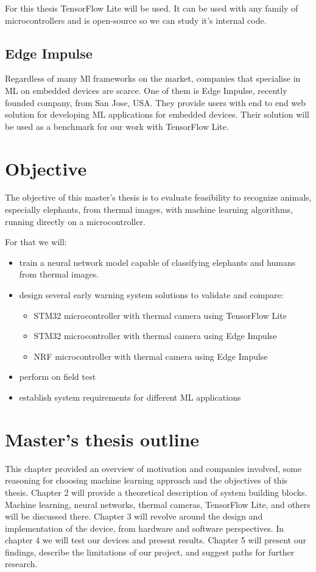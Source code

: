 For this thesis TensorFlow Lite will be used. It can be used with any family of microcontrollers and is open-source so we can study it's internal code.


\subsection{ Edge Impulse}

Regardless of many Ml frameworks on the market, companies that specialise in ML on embedded devices are scarce.
One of them is Edge Impulse, recently founded company, from San Jose, USA.
They provide users with end to end web solution for developing ML applications for embedded devices.
Their solution will be used as a benchmark for our work with TensorFlow Lite.


\section{ Objective}

The objective of this master's thesis is to evaluate feasibility to recognize animals, especially elephants, from thermal images, with machine learning algorithms, running directly on a microcontroller.

For that we will:

\begin{itemize}
    \item train a neural network model capable of classifying elephants and humans from thermal images.
    \item design several early warning system solutions to validate and compare:
    \begin{itemize}
        \item STM32 microcontroller with thermal camera using TensorFlow Lite
        \item STM32 microcontroller with thermal camera using Edge Impulse
        \item NRF microcontroller with thermal camera using Edge Impulse
    \end{itemize}
    \item perform on field test
    \item establish system requirements for different ML applications
\end{itemize}


\section{ Master's thesis outline}

This chapter provided an overview of motivation and companies involved, some reasoning for choosing machine learning approach and the objectives of this thesis.
Chapter 2 will provide a theoretical description of system building blocks. Machine learning, neural networks, thermal cameras, TensorFlow Lite, and others will be discussed there.
Chapter 3 will revolve around the design and implementation of the device, from hardware and software perspectives.
In chapter 4 we will test our devices and present results.
Chapter 5 will present our findings, describe the limitations of our project, and suggest paths for further research.

